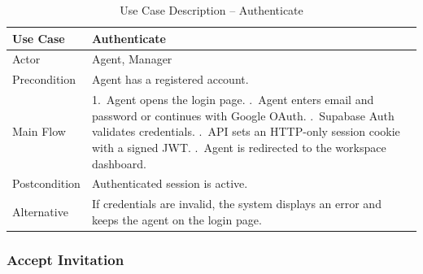 \documentclass[12pt,a4paper]{report}
\newcommand{\reporttablesetup}{%
  \small%
  \setlength{\tabcolsep}{5pt}%
  \renewcommand{\arraystretch}{1.22}%
  \arrayrulecolor{framegray}%
}
\begin{document}
\begin{table}[H]
  \centering
  \reporttablesetup
  \begin{tabularx}{\textwidth}{|p{3.1cm}|Y|}
    \hline
    Use Case     & Authenticate \\
    \hline
    Actor        & Agent, Manager \\
    \hline
    Precondition & Agent has a registered account. \\
    \hline
    Main Flow    & 1.\ Agent opens the login page. .\ Agent enters email and password or continues with Google OAuth.
                       .\ Supabase Auth validates credentials. .\ API sets an HTTP-only session cookie with a signed JWT. .\ Agent is redirected to the workspace dashboard. \\
    \hline
    Postcondition & Authenticated session is active. \\
    \hline
    Alternative  & If credentials are invalid, the system displays an error and keeps
                   the agent on the login page. \\
    \hline
  \end{tabularx}
  \caption{Use Case Description -- Authenticate}
  \label{tab:uc-auth}
\end{table}

\subsubsection{Accept Invitation}
\end{document}
